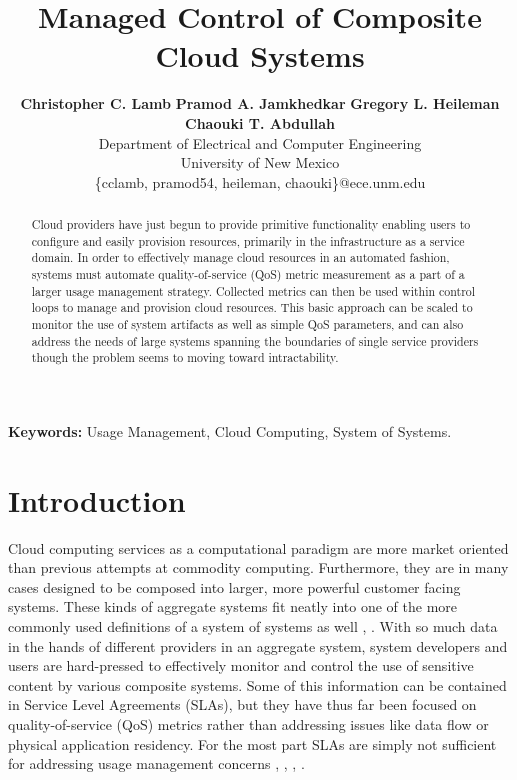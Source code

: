 \documentclass[times, 10pt,twocolumn]{article}
\begin{document}
\title{Managed Control of Composite Cloud Systems}

\author{
        \textbf{Christopher C. Lamb}\hspace*{0.1in}
        \textbf{Pramod A. Jamkhedkar}\hspace*{0.1in}
        \textbf{Gregory L. Heileman}\hspace*{0.1in}
        \textbf{Chaouki T. Abdullah}\\
        Department of Electrical and Computer Engineering \\
        University of New Mexico \\
        \small{\{cclamb, pramod54, heileman, chaouki\}@ece.unm.edu}
}

\maketitle
\thispagestyle{empty}

\begin{abstract}
Cloud providers have just begun to provide primitive functionality enabling users to configure and easily provision resources, primarily in the infrastructure as a service domain.  In order to effectively manage cloud resources in an automated fashion, systems must automate quality-of-service (QoS) metric measurement as a part of a larger usage management strategy.  Collected metrics can then be used within control loops to manage and provision cloud resources.  This basic approach can be scaled to monitor the use of system artifacts as well as simple QoS parameters, and can also address the needs of large systems spanning the boundaries of single service providers though the problem seems to moving toward intractability.
\end{abstract}

{
\setlength{\parindent}{0mm}
\textbf{Keywords:} Usage Management, Cloud Computing, System of Systems.
}

\section{Introduction}
Cloud computing services as a computational paradigm are more market oriented than previous attempts at commodity computing.  Furthermore, they are in many cases designed to be composed into larger, more powerful customer facing systems.  These kinds of aggregate systems fit neatly into one of the more commonly used definitions of a system of systems as well \cite{Sose:SageCuppan:2001}, \cite{Sose:Web:Defns}.  With so much data in the hands of different providers in an aggregate system, system developers and users are hard-pressed to effectively monitor and control the use of sensitive content by various composite systems.  Some of this information can be contained in Service Level Agreements (SLAs), but they have thus far been focused on quality-of-service (QoS) metrics rather than addressing issues like data flow or physical application residency.  For the most part SLAs are simply not sufficient for addressing usage management concerns \cite{WSA}, \cite{WSLA}, \cite{WSP}, \cite{PaRaSh:09}.
\end{document}
